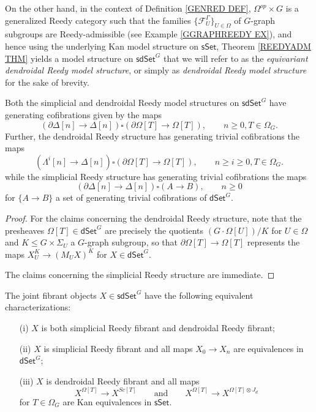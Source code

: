 \documentclass[a4paper,10pt,draft]{article}%
\numberwithin{equation}{section}%
\begin{document}
On the other hand, in the context of Definition \ref{GENRED DEF},
$\Omega^{op} \times G$ is a generalized Reedy category such that the families $\{\mathcal{F}_{U}^{\Gamma}\}_{U \in \Omega}$
of $G$-graph subgroups are Reedy-admissible 
(see Example \ref{GGRAPHREEDY EX}), 
and hence using the underlying 
Kan model structure on $\mathsf{sSet}$, 
Theorem \ref{REEDYADM THM} yields
a model structure on $\mathsf{sdSet}^G$
that we will refer to as the \textit{equivariant dendroidal Reedy model structure}, 
or simply as \textit{dendroidal Reedy model structure} for the sake of brevity.

\begin{proposition}
	Both the simplicial and dendroidal Reedy model structures on 
	$\mathsf{sdSet}^G$ have generating cofibrations given by the maps
\[
	\left(\partial \Delta [n] \to \Delta[n]\right)
		\square
	\left(\partial \Omega[T] \to \Omega[T]\right),
	\qquad
	n\geq 0, T \in \Omega_G.
\]
Further, the dendroidal Reedy structure has generating trivial cofibrations the maps
\begin{equation}\label{DENDTRIVCOF EQ}
	\left(\Lambda^i [n] \to \Delta[n]\right)
		\square
	\left(\partial \Omega[T] \to \Omega[T]\right),
	\qquad
	n\geq i \geq 0, T \in \Omega_G.
\end{equation}
while the simplicial Reedy structure has generating trivial cofibrations the maps
\begin{equation}\label{SIMPTRIVCOF EQ}
	\left(\partial \Delta [n] \to \Delta[n]\right)
		\square
	\left(A \to B\right),
	\qquad
	n\geq 0
\end{equation}
for $\{A \to B\}$ a set of generating trivial cofibrations of
$\mathsf{dSet}^G$.
\end{proposition}

\begin{proof}
	For the claims concerning the dendroidal Reedy structure, 
	note that the presheaves $\Omega[T] \in \mathsf{dSet}^G$
	are precisely the quotients $(G \cdot \Omega[U])/K$ for $U\in \Omega$ and $K \leq G \times \Sigma_U$ a $G$-graph subgroup,
	so that $\partial \Omega[T] \to \Omega[T]$
	represents the maps $X_U^K \to (M_U X)^K$ for $X \in \mathsf{dSet}^G$.
	
	The claims concerning the simplicial Reedy structure are immediate.
\end{proof}


\begin{corollary}\label{JOINTFIBCHAR COR}
The joint fibrant objects $X \in \mathsf{sdSet}^G$ have the following equivalent characterizations:
\begin{itemize}
	\item[(i)] $X$ is both simplicial Reedy fibrant and dendroidal Reedy fibrant;
	\item[(ii)] $X$ is simplicial Reedy fibrant and all maps 
	$X_0 \to X_n$ are equivalences in $\mathsf{dSet}^{G}$;
	\item[(iii)] $X$ is dendroidal Reedy fibrant and all maps
\[
	X^{\Omega[T]} \to X^{Sc[T]}
\qquad \text{and} \qquad
	X^{\Omega[T]} \to X^{\Omega[T]\otimes J_d}
\]
for $T \in \Omega_G$ are Kan equivalences in $\mathsf{sSet}$.
\end{itemize}
\end{corollary}
\end{document}
